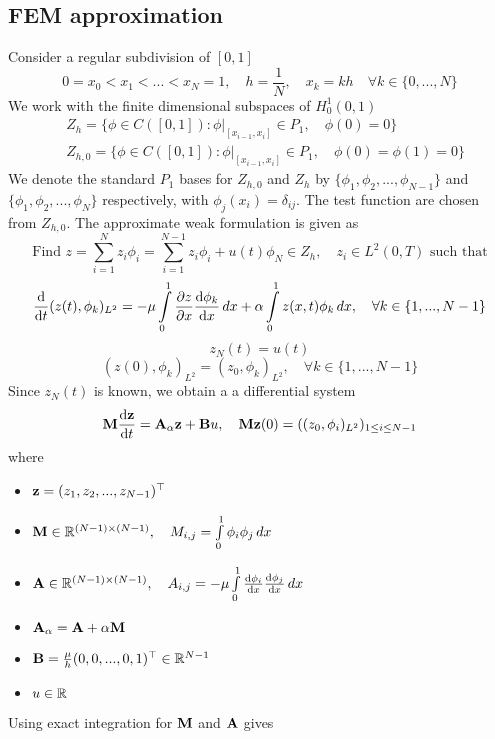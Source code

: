 \documentclass[12pt]{article}
\begin{document}
\subsection{FEM approximation}
Consider a regular subdivision of $[0,1]$
\[
 0 = x_0 < x_1 < ... < x_N = 1, \quad h = \frac{1}{N}, \quad x_k = kh \quad \forall k \in \{0,...,N\}
\]
We work with the finite dimensional subspaces of $H^1_{0}(0,1)$
\begin{equation*}
\begin{aligned}
  & Z_h = \{ \phi \in C([0,1]) : \phi|_{[x_{i-1},x_i]} \in P_1, \quad \phi(0) = 0 \} \\
  & Z_{h,0} = \{ \phi \in C([0,1]) : \phi|_{[x_{i-1},x_i]} \in P_1, \quad \phi(0) = \phi(1) = 0 \}
\end{aligned}
\end{equation*}
We denote the standard $P_1$ bases for $Z_{h,0}$ and $Z_{h}$ by $\{\phi_1, \phi_2,...,\phi_{N-1}\}$ and $\{\phi_1, \phi_2,...,\phi_N\}$ respectively, with $\phi_j(x_i) = \delta_{ij}$. The test function are chosen from $Z_{h,0}$. The approximate weak formulation is given as
\[
 \text{Find } z = \sum \limits_{i=1}^N z_i \phi_i = \sum \limits_{i=1}^{N-1} z_i \phi_i + u(t) \phi_N \in Z_h, \quad z_i \in L^2(0,T) \text{ such that}
\]
\[
 \frac{\textrm{d} }{\textrm{d} t}(z(t), \phi_k)_{L^2} = - \mu \int \limits^{1}_{0} \frac{\partial z}{\partial x} \frac{\textrm{d} \phi_k}{\textrm{d} x} \, dx +  \alpha \int \limits^{1}_{0} z(x,t) \phi_k \, dx, \quad \forall k \in \{1,..., N-1\}
\]
\[
 z_N(t) = u(t)
\]
\[
 (z(0),\phi_k)_{L^2} = (z_0 ,\phi_k)_{L^2}, \quad \forall k \in \{1,..., N-1\}
\]
Since $z_N(t)$ is known, we obtain a a differential system 
\[
 {\mathbf M} \frac{\textrm{d} {\mathbf z}}{\textrm{d} t} = {\mathbf A}_\alpha {\mathbf z} + {\mathbf B} u , \quad {\mathbf M} {\mathbf z}(0) = ((z_0,\phi_i)_{L^2})_{1\le i \le {N-1}}
\]
where
\begin{itemize}
 \item ${\mathbf z} = (z_1,z_2,...,z_{N-1})^\top$
 \item ${\mathbf M} \in \mathbb{R}^{(N-1) \times (N-1)}, \quad M_{i,j} = \int \limits_0^1 \phi_i \phi_j \, dx$
 \item ${\mathbf A} \in \mathbb{R}^{(N-1) \times (N-1)}, \quad A_{i,j} = - \mu \int \limits_0^1 \frac{\textrm{d} \phi_i}{\textrm{d} x} \frac{\textrm{d} \phi_j}{\textrm{d} x} \, dx$
 \item ${\mathbf A}_\alpha = {\mathbf A} + \alpha {\mathbf M}$
 \item ${\mathbf B} =  \frac{\mu}{h} (0,0,...,0,1)^\top \in \mathbb{R}^{N-1}$
 \item $u \in \mathbb{R}$
\end{itemize}
Using exact integration for ${\mathbf M}$ and ${\mathbf A}$ gives
\end{document}
